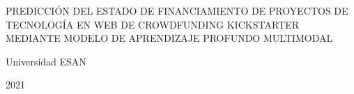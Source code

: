 \begin{center}
	{PREDICCIÓN DEL ESTADO DE FINANCIAMIENTO DE PROYECTOS DE TECNOLOGÍA EN WEB DE CROWDFUNDING KICKSTARTER MEDIANTE MODELO DE APRENDIZAJE PROFUNDO MULTIMODAL}
\end{center}

\vspace{2.5cm}

\dotfill

\vspace{1.5cm}

\dotfill

\vspace{1.5cm}

\dotfill

\vspace{1.5cm}

\centerline{Universidad ESAN}
\centerline{2021}